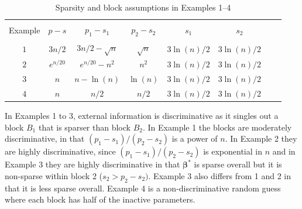 \documentclass[bj,authoryear]{imsart}
\theoremstyle{plain}
\newcommand{\david}[1]{{\small{\color{blue} \sf $\heartsuit$ [David: #1]}}}
\newcommand{\paul}[1]{{\small{\color{green} \sf $\spadesuit$ Paul: #1}}}
\newcommand{\bs}{\boldsymbol}
\begin{document}
\begin{table}[ht]
\caption{Sparsity and block assumptions in Examples 1--4}
\label{tab:examples}
\begin{tabular}{@{}cccccccc@{}}
\hline \\[-1em]
Example & $p-s$ & $p_1-s_1$ & $p_2-s_2$ & $s_1$ 
& $s_2$\\[1pt]
\hline\\[-1em]
$1$    & $3n/2$ & $3n/2-\sqrt{n}$ & $\sqrt{n}$  & $3\ln(n)/2$  & $3\ln(n)/2$ \\[1pt]
$2$    & $e^{n/20}$ & $e^{n/20}-n^2$ & $n^2$  & $3\ln(n)/2$  & $3\ln(n)/2$   \\[1pt]
$3$    & $n$ & $n-\ln(n)$ & $\ln(n)$  & $3\ln(n)/2$  & $3\ln(n)/2$   \\[1pt]
$4$    & $n$ & $n/2$ & $n/2$  & $3\ln(n)/2$  & $3\ln(n)/2$ \\[3pt]
\hline
\end{tabular}
\end{table}

In Examples 1 to 3, external information is discriminative as it singles out a block $B_1$ that is
sparser than block $B_2$. 
In Example 1 the blocks are 
moderately discriminative, in that $(p_1-s_1)/(p_2-s_2)$ is a power of $n$. In Example 2 they are highly discriminative, since $(p_1-s_1)/(p_2-s_2)$ is exponential in $n$ and in Example 3 they are highly discriminative in that $\bs\beta^*$ is sparse overall but it is non-sparse within block 2 ($s_2 > p_2 - s_2)$. %
Example 3 also differs from 1 and 2 in that it is less sparse overall. %
Example 4 is a non-discriminative
random guess where each block has half of the inactive parameters. %
\end{document}
